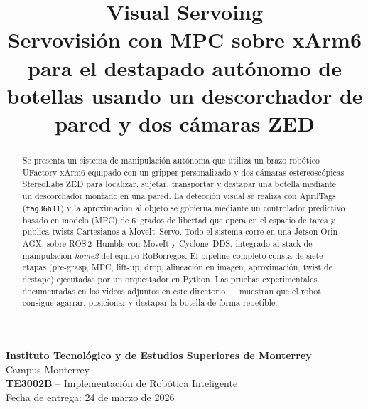 \documentclass[conference]{IEEEtran}
\begin{document}
\title{Visual Servoing\\[2pt]
\large Servovisi\'on con MPC sobre xArm6 para el destapado aut\'onomo de
botellas usando un descorchador de pared y dos c\'amaras ZED}

\author{
\and
{}
\and
{}
\and
{}
}

\maketitle

\begin{center}
\vspace{-0.5em}
\textbf{Instituto Tecnol\'ogico y de Estudios Superiores de Monterrey}\\
Campus Monterrey\\[2pt]
\textbf{TE3002B} -- Implementaci\'on de Rob\'otica Inteligente\\[2pt]
Fecha de entrega: 24 de marzo de 2026\\[6pt]
\end{center}

\begin{abstract}
Se presenta un sistema de manipulaci\'on aut\'onoma que utiliza un brazo
rob\'otico UFactory xArm6 equipado con un gripper personalizado y dos
c\'amaras estereosc\'opicas StereoLabs ZED para localizar, sujetar,
transportar y destapar una botella mediante un descorchador montado en
una pared. La detecci\'on visual se realiza con AprilTags
(\texttt{tag36h11}) y la aproximaci\'on al objeto se gobierna mediante
un controlador predictivo basado en modelo (MPC) de 6~grados de
libertad que opera en el espacio de tarea y publica twists Cartesianos
a MoveIt~Servo. Todo el sistema corre en una Jetson Orin AGX, sobre
ROS\,2~Humble con MoveIt y Cyclone~DDS, integrado al stack de
manipulaci\'on \emph{home2} del equipo RoBorregos. El pipeline completo
consta de siete etapas (pre-grasp, MPC, lift-up, drop, alineaci\'on en
imagen, aproximaci\'on, twist de destape) ejecutadas por un
orquestador en Python. Las pruebas experimentales --- documentadas en
los videos adjuntos en este directorio --- muestran que el robot
consigue agarrar, posicionar y destapar la botella de forma repetible.
\end{abstract}
\end{document}
